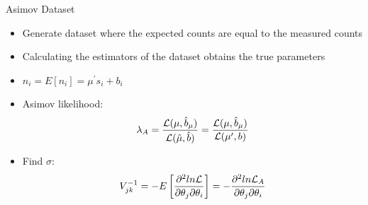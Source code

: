 \documentclass[aspectratio=1610, 9pt]{beamer}
\begin{document}
\begin{frame}{Asimov Dataset}
    \Large
    \begin{itemize}
        \item Generate dataset where the expected counts are equal to the measured counts
        \item Calculating the estimators of the dataset obtains the true parameters
        \item $n_i = E[n_i] = \mu^\prime s_i + b_i$
        \item Asimov likelihood: \\
            \begin{align}
                \lambda_A = \frac{\mathcal{L}(\mu,\hat{b}_\mu)}{\mathcal{L}(\hat{\mu},\hat{b})} = \frac{\mathcal{L}(\mu,\hat{b}_\mu)}{\mathcal{L}(\mu^\prime,b)} \notag
            \end{align}
        \item Find $\sigma$:\\
            \begin{align}
                V^{-1}_{jk} = -E\left[\frac{\partial^2 ln\mathcal{L}}{\partial\theta_j\partial\theta_i}\right] = -\frac{\partial^2 ln\mathcal{L}_A}{\partial\theta_j\partial\theta_i} \notag
            \end{align}
    \end{itemize}
\end{frame}
\end{document}
